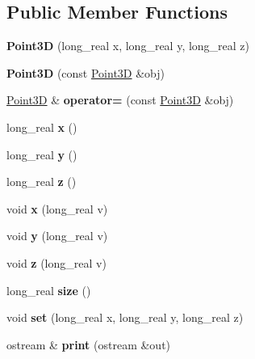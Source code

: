 \subsection*{Public Member Functions}
\begin{DoxyCompactItemize}
\item 
\mbox{\label{classez_1_1maths_1_1Point3D_aaeb33b8a82df3e1c78fbee5647ef0256}} 
{\bfseries Point3D} (long\+\_\+real x, long\+\_\+real y, long\+\_\+real z)
\item 
\mbox{\label{classez_1_1maths_1_1Point3D_a4fdd6e6105a8b231ba51664cacab27d9}} 
{\bfseries Point3D} (const \hyperlink{classez_1_1maths_1_1Point3D}{Point3D} \&obj)
\item 
\mbox{\label{classez_1_1maths_1_1Point3D_a9b0112b73e13090286a83cd8e9e4d9ef}} 
\hyperlink{classez_1_1maths_1_1Point3D}{Point3D} \& {\bfseries operator=} (const \hyperlink{classez_1_1maths_1_1Point3D}{Point3D} \&obj)
\item 
\mbox{\label{classez_1_1maths_1_1Point3D_a46809654eaa2e09bc6aa1afe582cf5b2}} 
long\+\_\+real {\bfseries x} ()
\item 
\mbox{\label{classez_1_1maths_1_1Point3D_ac569ad311073a0a31b06c0e3af94b52f}} 
long\+\_\+real {\bfseries y} ()
\item 
\mbox{\label{classez_1_1maths_1_1Point3D_ad60fb9bcadb3752a6fc18cdf3dec8b90}} 
long\+\_\+real {\bfseries z} ()
\item 
\mbox{\label{classez_1_1maths_1_1Point3D_a7cbe01493287cffcb8ecb960d2944b8b}} 
void {\bfseries x} (long\+\_\+real v)
\item 
\mbox{\label{classez_1_1maths_1_1Point3D_a32e942b955883fa34ee84040a7a3f85f}} 
void {\bfseries y} (long\+\_\+real v)
\item 
\mbox{\label{classez_1_1maths_1_1Point3D_a44fe82eddb4fa038bacdc32283a7c20a}} 
void {\bfseries z} (long\+\_\+real v)
\item 
\mbox{\label{classez_1_1maths_1_1Point3D_a24086e2fbb068934a284f86a26f16744}} 
long\+\_\+real {\bfseries size} ()
\item 
\mbox{\label{classez_1_1maths_1_1Point3D_ae68e4c39e9006c070ce532e6874ddd86}} 
void {\bfseries set} (long\+\_\+real x, long\+\_\+real y, long\+\_\+real z)
\item 
\mbox{\label{classez_1_1maths_1_1Point3D_a1f4de9f86d60ab98f5753a628091c8a7}} 
ostream \& {\bfseries print} (ostream \&out)
\end{DoxyCompactItemize}
